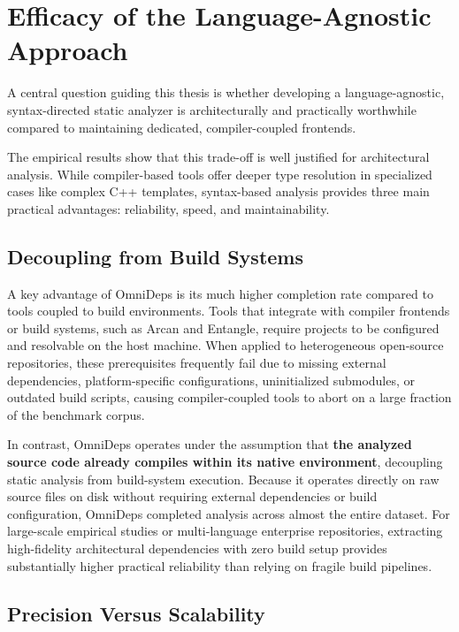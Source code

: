 \section[Efficacy of the Language-Agnostic Approach]{Efficacy of the
Language-Agnostic\\Approach}
\label{sec:discussion_efficacy}

A central question guiding this thesis is whether developing a
language-agnostic, syntax-directed static analyzer is architecturally and
practically worthwhile compared to maintaining dedicated, compiler-coupled
frontends.

The empirical results show that this trade-off is well justified for
architectural analysis. While compiler-based tools offer deeper type resolution
in specialized cases like complex C++ templates, syntax-based analysis provides
three main practical advantages: reliability, speed, and maintainability.

\subsection{Decoupling from Build Systems}
\label{subsec:discussion_build_decoupling}

A key advantage of OmniDeps is its much higher completion rate compared to
tools coupled to build environments. Tools that integrate with compiler
frontends or build systems, such as Arcan and Entangle, require projects to be
configured and resolvable on the host machine. When applied to heterogeneous
open-source repositories, these prerequisites frequently fail due to missing
external dependencies, platform-specific configurations, uninitialized
submodules, or outdated build scripts, causing compiler-coupled tools to abort
on a large fraction of the benchmark corpus.

In contrast, OmniDeps operates under the assumption that \textbf{the analyzed
source code already compiles within its native environment}, decoupling static
analysis from build-system execution. Because it operates directly on raw
source files on disk without requiring external dependencies or build
configuration, OmniDeps completed analysis across almost the entire dataset.
For large-scale empirical studies or multi-language enterprise repositories,
extracting high-fidelity architectural dependencies with zero build setup
provides substantially higher practical reliability than relying on fragile
build pipelines.

\subsection{Precision Versus Scalability}
\label{subsec:discussion_precision_tradeoff}


